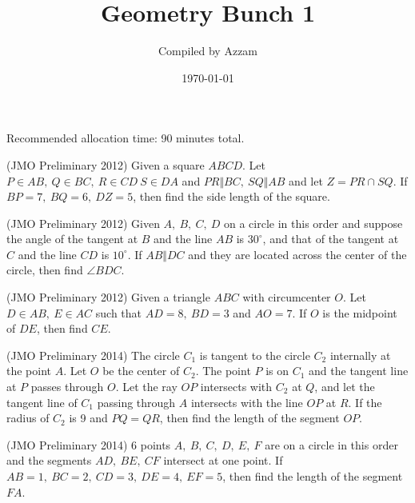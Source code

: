 \documentclass[11pt]{scrartcl}
\begin{document}
	\title{Geometry Bunch 1} %
	\date{\today}
	\author{Compiled by Azzam}
	\maketitle
	
	Recommended allocation time: 90 minutes total.
	
	\begin{soalbaru}
	(JMO Preliminary 2012) Given a square $ABCD$. Let $P\in{AB},\ Q\in{BC},\ R\in{CD}\ S\in{DA}$ and $PR\Vert BC,\ SQ\Vert AB$ and let $Z=PR\cap SQ$. If $BP=7,\ BQ=6,\ DZ=5$, then find the side length of the square.
	\end{soalbaru}
	
    \begin{soalbaru}
    (JMO Preliminary 2012)  Given $A,\ B,\ C,\ D$ on a circle in this order and suppose the angle of the tangent at $B$ and the line $AB$ is $30^\circ$, and that of the tangent at $C$ and the line $CD$ is $10^\circ$. If $AB\Vert DC$ and they are located across the center of the circle, then find $\angle{BDC}$.
    \end{soalbaru}
    
    \begin{soalbaru}
    (JMO Preliminary 2012) Given a triangle $ABC$ with circumcenter $O$. Let $D\in{AB},\ E\in{AC}$ such that $AD=8,\ BD=3$ and $AO=7$. If $O$ is the midpoint of $DE$, then find $CE$.
    \end{soalbaru}
    
    \begin{soalbaru}
    (JMO Preliminary 2014) The circle $C_1$ is tangent to the circle $C_2$ internally at the point $A$. Let $O$ be the center of $C_2$. The point $P$ is on $C_1$ and the tangent line at $P$ passes through $O$. Let the ray $OP$ intersects with $C_2$ at $Q$, and let the tangent line of $C_1$ passing through $A$ intersects with the line $OP$ at $R$. If the radius of $C_2$ is 9 and $PQ=QR$, then find the length of the segment $OP$. %
    \end{soalbaru}
    
    \begin{soalbaru}
    (JMO Preliminary 2014) 6 points $A,\ B,\ C,\ D,\ E,\ F$ are on a circle in this order and the segments $AD,\ BE,\ CF$ intersect at one point. If $AB=1,\ BC=2,\ CD=3,\ DE=4,\ EF=5$, then find the length of the segment $FA$.
    \end{soalbaru}
    
\end{document}
